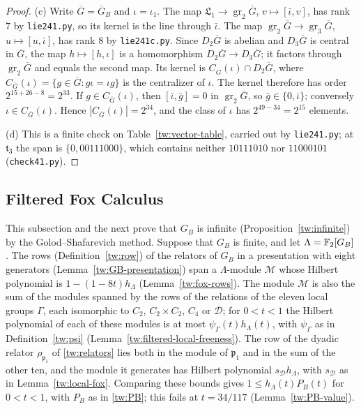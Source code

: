 \begin{proof}
(c) Write $\overline G=\overline G_B$ and $\iota=\iota_1$. The map
$\mathfrak L_1\to\operatorname{gr}_2\overline G$, $v\mapsto[\bar\iota,v]$, has
rank $7$ by \texttt{lie241.py}, so its kernel is the line through
$\bar\iota$. The map
$\operatorname{gr}_2\overline G\to\operatorname{gr}_3\overline G$,
$u\mapsto[u,\bar\iota]$, has rank $8$ by \texttt{lie241c.py}. Since
$D_2\overline G$ is abelian and $D_3\overline G$ is central in $\overline G$,
the map $h\mapsto[h,\iota]$ is a homomorphism $D_2\overline G\to D_3\overline G$;
it factors through $\operatorname{gr}_2\overline G$ and equals the second map.
Its kernel is $C_{\overline G}(\iota)\cap D_2\overline G$, where
$C_{\overline G}(\iota)=\{g\in\overline G:g\iota=\iota g\}$ is the
centralizer of $\iota$. The kernel therefore has order
$2^{15+26-8}=2^{33}$. If $g\in C_{\overline G}(\iota)$, then
$[\bar\iota,\bar g]=0$ in $\operatorname{gr}_2\overline G$, so
$\bar g\in\{0,\bar\iota\}$; conversely $\iota\in C_{\overline G}(\iota)$.
Hence $|C_{\overline G}(\iota)|=2^{34}$, and the class of $\iota$ has
$2^{49-34}=2^{15}$ elements.

(d) This is a finite check on Table~\ref{tw:vector-table}, carried out by
\texttt{lie241.py}; at $\mathfrak t_3$ the span is $\{0,00111000\}$, which
contains neither $10111010$ nor $11000101$ (\texttt{check41.py}).
\end{proof}

\subsection{Filtered Fox Calculus}\label{tw:fox-section}
This subsection and the next prove that $G_B$ is infinite
(Proposition~\ref{tw:infinite}) by the Golod--Shafarevich method. Suppose
that $G_B$ is finite, and let $\Lambda=\mathbb F_2[G_B]$. The rows
(Definition~\ref{tw:row}) of the relators of $G_B$ in a presentation with
eight generators (Lemma~\ref{tw:GB-presentation}) span a $\Lambda$-module
$\mathcal M$ whose Hilbert polynomial is $1-(1-8t)h_\Lambda$
(Lemma~\ref{tw:fox-rows}). The module $\mathcal M$ is also the sum of the
modules spanned by the rows of the relations of the eleven local groups
$\Gamma$, each isomorphic to $C_2$, $C_2\times C_2$, $C_4$ or $\mathcal D$; for $0<t<1$
the Hilbert polynomial of each of these modules is at most
$\psi_\Gamma(t)h_\Lambda(t)$, with $\psi_\Gamma$ as in
Definition~\ref{tw:psi} (Lemma~\ref{tw:filtered-local-freeness}). The row of
the dyadic relator $\rho_{\mathfrak p_1}$ of \eqref{tw:relators} lies both in
the module of $\mathfrak p_1$ and in the sum of the other ten, and the module
it generates has Hilbert polynomial $s_{\mathcal D}h_\Lambda$, with $s_{\mathcal D}$ as in
Lemma~\ref{tw:local-fox}. Comparing these bounds gives
$1\le h_\Lambda(t)P_B(t)$ for $0<t<1$, with $P_B$ as in \eqref{tw:PB}; this
fails at $t=34/117$ (Lemma~\ref{tw:PB-value}).

